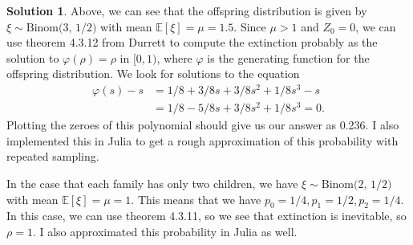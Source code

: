 \documentclass[12pt]{article}
\newcommand{\Expect}{\mathbb{E}}
\renewcommand{\phi}{\varphi}
\theoremstyle{definition}
\newtheorem{sol}{Solution}
\theoremstyle{remark}
\begin{document}
\begin{sol}\leavevmode
    Above, we can see that the offspring distribution is given by $\xi \sim \text{Binom(3, 1/2)}$ with mean $\Expect[\xi] = \mu = 1.5$. Since $\mu > 1$ and $Z_0 = 0$, we can use theorem 4.3.12 from Durrett to compute the extinction probably as the solution to $\phi(\rho) = \rho$ in $[0,1)$, where $\phi$ is the generating function for the offspring distribution. We look for solutions to the equation
\begin{align}
    \phi(s) - s &= 1/8 + 3/8s + 3/8 s^2 + 1/8 s^3 -s \\
                &= 1/8 - 5/8 s + 3/8 s^2 + 1/8 s^3 = 0.
\end{align}
Plotting the zeroes of this polynomial should give us our answer as 0.236. I also implemented this in Julia to get a rough approximation of this probability with repeated sampling.

In the case that each family has only two children, we have $\xi \sim \text{Binom(2, 1/2)}$ with mean $\Expect[\xi] = \mu = 1$. This means that we have $p_0 = 1/4, p_1 = 1/2, p_2 = 1/4$. In this case, we can use theorem 4.3.11, so we see that extinction is inevitable, so $\rho = 1$. I also approximated this probability in Julia as well.
\end{sol}

\end{document}
